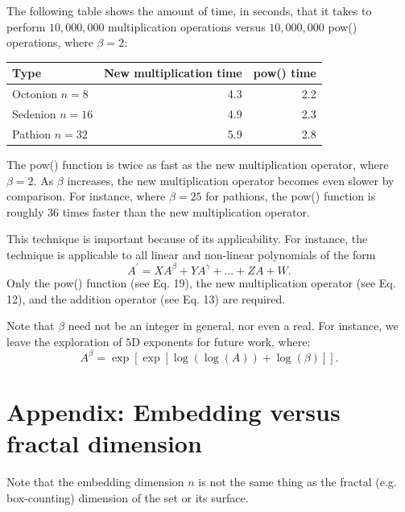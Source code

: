 \documentclass[12pt]{article}
\begin{document}
The following table shows the amount of time, in seconds, that it takes to perform $10,000,000$ multiplication operations versus $10,000,000$ pow() operations, where $\beta = 2$:
\begin{center}
\begin{tabular}{| l | r | r |}
  \hline
  Type & New multiplication time & pow() time \\
\hline
\hline
  Octonion $n = 8$ &4.3   &  2.2 \\
  Sedenion $n = 16$ & 4.9  & 2.3   \\
  Pathion $n = 32$ & 5.9  & 2.8   \\
  \hline  
\end{tabular}
\end{center}
The pow() function is twice as fast as the new multiplication operator, where $\beta = 2$.
As $\beta$ increases, the new multiplication operator becomes even slower by comparison.
For instance, where $\beta = 25$ for pathions, the pow() function is roughly $36$ times faster than the new multiplication operator.

This technique is important because of its applicability.
For instance, the technique is applicable to all linear and non-linear polynomials of the form 
\begin{equation}
A^{\prime} = X A^\beta + Y A^\gamma + ... + Z A + W.
\end{equation}
Only the pow() function (see Eq. 19), the new multiplication operator (see Eq. 12), and the addition operator (see Eq. 13) are required.

Note that $\beta$ need not be an integer in general, nor even a real.
For instance, we leave the exploration of $5$D exponents for future work, where:
\begin{equation}
A^\beta = \exp[\exp[ \log(\log(A)) + \log(\beta)]].
\end{equation}



\section{Appendix: Embedding versus fractal dimension}

Note that the embedding dimension $n$ is not the same thing as the fractal (e.g. box-counting) dimension of the set or its surface.
\end{document}
